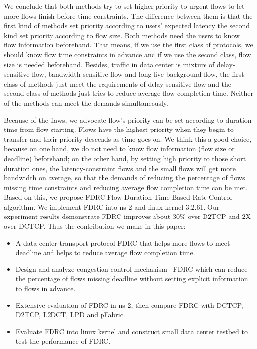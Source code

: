 \documentclass[10pt, conference, letterpaper]{IEEEtran}
\begin{document}
We conclude that both methods try to set higher priority to urgent flows to let more flows finish before time constraints. 
The difference between them is that 
the first kind of methods set priority according to users' expected latency the second kind set priority according to flow size.
Both methods need the users to know flow information beforehand. 
That means, if we use the first class of protocols, we should know flow time constraints in advance and 
if we use the second class, flow size is needed beforehand.
Besides, traffic in data center is mixture of delay-sensitive flow, bandwidth-sensitive flow and long-live background flow, the first class of methods
just meet the requirements of delay-sensitive flow and the second class of methods just tries to reduce average flow completion time.
Neither of the methods can meet the demands simultaneously.



Because of the flaws, we advocate flow's priority can be set according to duration time from flow starting. 
Flows have the highest priority when they begin to transfer and their priority descends as time goes on.
We think this a good choice, because
on one hand, we do not need to know flow information (flow size or deadline) beforehand;
on the other hand, by setting high priority to those short duration ones,  
the latency-constraint flows and the small flows will get more bandwidth on average,
so that the demands of reducing the percentage of flows missing time constraints and reducing average flow completion time can be met.
Based on this, we propose FDRC-Flow Duration Time Based Rate Control algorithm.
We implement FDRC into ns-2  \cite{ns2} and linux kernel 3.2.61.
Our experiment results demonstrate FDRC improves about 30\% over D2TCP and 2X over DCTCP. 
Thus the contribution we make in this paper:


\begin{itemize}[]
\item A data center transport protocol FDRC that helps more flows to meet deadline and helps to reduce average flow completion time.
\item Design and analyze congestion control mechanism-- FDRC which can reduce the percentage of flows missing deadline without setting explicit information to flows in advance.
\item Extensive evaluation of FDRC in ns-2, then compare FDRC with DCTCP, D2TCP, L2DCT, LPD and pFabric.
\item Evaluate FDRC into linux kernel and construct small data center testbed to test the performance of FDRC.
\end{itemize}
\end{document}
